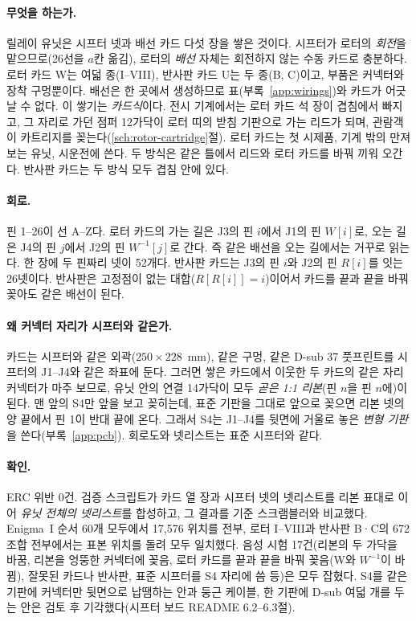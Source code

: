 \paragraph{무엇을 하는가.} 릴레이 유닛은 시프터 넷과 배선 카드 다섯 장을 쌓은 것이다. 시프터가 로터의 \emph{회전}을
맡으므로(26선을 $a$칸 옮김), 로터의 \emph{배선} 자체는 회전하지 않는 수동 카드로 충분하다. 로터 카드 W는 여덟
종(I--VIII), 반사판 카드 U는 두 종(B, C)이고, 부품은 커넥터와 장착 구멍뿐이다. 배선은 
한 곳에서 생성하므로 표(부록~\ref{app:wirings})와 카드가 어긋날 수 없다. 이 쌓기는 \emph{카드식}이다. 전시 기계에서는
로터 카드 석 장이 겹침에서 빠지고, 그 자리로 가던 점퍼 12가닥이 로터 띠의 받침 기판으로 가는 리드가 되며, 관람객이
카트리지를 꽂는다(\ref{sch:rotor-cartridge}절). 로터 카드는 첫 시제품, 기계 밖의 만져 보는 유닛, 시운전에 쓴다. 두
방식은 같은 틀에서 리드와 로터 카드를 바꿔 끼워 오간다. 반사판 카드는 두 방식 모두 겹침 안에 있다.

\paragraph{회로.} 핀 1--26이 선 A--Z다. 로터 카드의 가는 길은 J3의 핀 $i$에서 J1의 핀 $W[i]$로, 오는 길은 J4의 핀
$j$에서 J2의 핀 $W^{-1}[j]$로 간다. 즉 같은 배선을 오는 길에서는 거꾸로 읽는다. 한 장에 두 핀짜리 넷이 52개다.
반사판 카드는 J3의 핀 $i$와 J2의 핀 $R[i]$를 잇는 26넷이다. 반사판은 고정점이 없는 대합($R[R[i]] = i$)이어서 카드를
끝과 끝을 바꿔 꽂아도 같은 배선이 된다.

\paragraph{왜 커넥터 자리가 시프터와 같은가.} 카드는 시프터와 같은 외곽($250 \times 228$~mm), 같은 구멍, 같은 D-sub
37 풋프린트를 시프터의 J1--J4와 같은 좌표에 둔다. 그러면 쌓은 카드에서 이웃한 두 카드의 같은 자리 커넥터가 마주
보므로, 유닛 안의 연결 14가닥이 모두 \emph{곧은 1:1 리본}(핀 $n$을 핀 $n$에)이 된다. 맨 앞의 S4만 앞을 보고 꽂히는데,
표준 기판을 그대로 앞으로 꽂으면 리본 넷의 양 끝에서 핀 1이 반대 끝에 온다. 그래서 S4는 J1--J4를 뒷면에 거울로 놓은
\emph{변형 기판}을 쓴다(부록~\ref{app:pcb}). 회로도와 넷리스트는 표준 시프터와 같다.

\paragraph{확인.} ERC 위반 0건. 검증 스크립트가 카드 열 장과 시프터 넷의 넷리스트를 리본 표대로 이어 \emph{유닛
전체의 넷리스트}를 합성하고, 그 결과를 기준 스크램블러와 비교했다. Enigma~I 순서 60개 모두에서 17,576 위치를 전부,
로터 I--VIII과 반사판 B·C의 672 조합 전부에서는 표본 위치를 돌려 모두 일치했다. 음성 시험 17건(리본의 두 가닥을 바꿈, 리본을 엉뚱한
커넥터에 꽂음, 로터 카드를 끝과 끝을 바꿔 꽂음(W와 $W^{-1}$이 바뀜), 잘못된 카드나 반사판, 표준 시프터를 S4 자리에 씀
등)은 모두 잡혔다. S4를 같은 기판에 커넥터만 뒷면으로 납땜하는 안과
둥근 케이블, 한 기판에 D-sub 여덟 개를 두는 안은 검토 후 기각했다(시프터 보드 README 6.2--6.3절).


